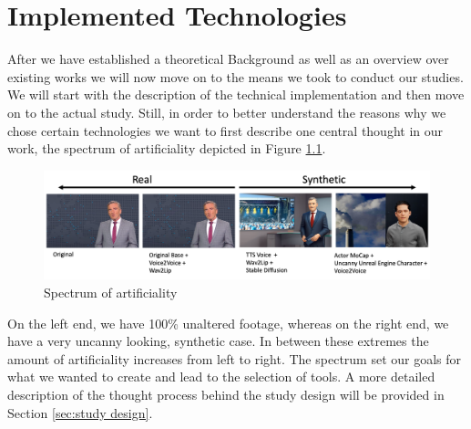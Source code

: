 \documentclass[
  a4paper,  %
  twoside,  %
  bibliography=totoc,
  headsepline,
  cleardoublepage=empty,
  parskip=half,
  draft=false
]{scrbook}
\begin{document}
\chapter{Implemented Technologies}
\label{chap:implementation}

After we have established a theoretical Background as well as an overview over existing works we will now move on to the means we took to conduct our studies. We will start with the description of the technical implementation and then move on to the actual study. Still, in order to better understand the reasons why we chose certain technologies we want to first describe one central thought in our work, the spectrum of artificiality depicted in Figure \ref{fig:spectrum}.
\begin{figure}[h]
  \centering
  \includegraphics[width=1\textwidth]{./graphics/images/spectrum-art.png}
  \caption{Spectrum of artificiality}
  \label{fig:spectrum}
\end{figure}
On the left end, we have 100\% unaltered footage, whereas on the right end, we have a very uncanny looking, synthetic case. In between these extremes the amount of artificiality increases from left to right. The spectrum set our goals for what we wanted to create and lead to the selection of tools. A more detailed description of the thought process behind the study design will be provided in Section \ref{sec:study design}.
\end{document}
